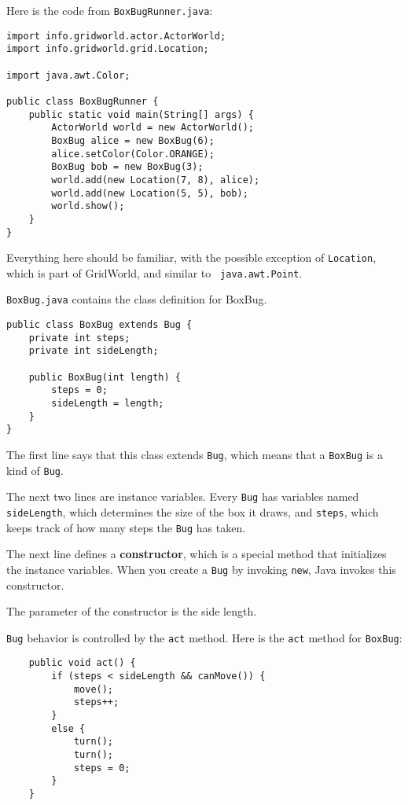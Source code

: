 \documentclass[12pt]{book}
\theoremstyle{definition}
\begin{document}
Here is the code from {\tt BoxBugRunner.java}:

\begin{lstlisting}
import info.gridworld.actor.ActorWorld;
import info.gridworld.grid.Location;

import java.awt.Color;

public class BoxBugRunner {
    public static void main(String[] args) {
        ActorWorld world = new ActorWorld();
        BoxBug alice = new BoxBug(6);
        alice.setColor(Color.ORANGE);
        BoxBug bob = new BoxBug(3);
        world.add(new Location(7, 8), alice);
        world.add(new Location(5, 5), bob);
        world.show();
    }
}
\end{lstlisting}

Everything here should be familiar, with the possible exception of
{\tt Location}, which is part of GridWorld, and similar to {\tt
  java.awt.Point}.

{\tt BoxBug.java} contains the class definition for BoxBug.

\begin{lstlisting}
public class BoxBug extends Bug {
    private int steps;
    private int sideLength;

    public BoxBug(int length) {
        steps = 0;
        sideLength = length;
    }
}
\end{lstlisting}

The first line says that this class extends {\tt Bug}, which means
that a {\tt BoxBug} is a kind of {\tt Bug}.

The next two lines are instance variables.  Every {\tt Bug}
has variables named {\tt sideLength}, which determines the size of the
box it draws, and {\tt steps}, which keeps track of how many steps
the {\tt Bug} has taken.

The next line defines a {\bf constructor}, which is a special
method that initializes the instance variables.  When you create
a {\tt Bug} by invoking {\tt new}, Java invokes this constructor.

The parameter of the constructor is the side length.

{\tt Bug} behavior is controlled by the {\tt act} method.  Here
is the {\tt act} method for {\tt BoxBug}:

\begin{lstlisting}
    public void act() {
        if (steps < sideLength && canMove()) {
            move();
            steps++;
        }
        else {
            turn();
            turn();
            steps = 0;
        }
    }
\end{lstlisting}
\end{document}
